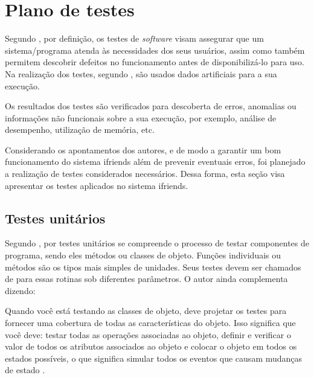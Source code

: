 \section{Plano de testes}
Segundo , por definição, os testes de \textit{software} visam assegurar que um sistema/programa atenda às necessidades dos seus usuários, assim como também permitem descobrir defeitos no funcionamento antes de disponibilizá-lo para uso. Na realização dos testes, segundo , são usados dados artificiais para a sua execução.

\begin{citacao}
Os resultados dos testes são verificados para descoberta de erros, anomalias ou informações não funcionais sobre a sua execução, por exemplo, análise de desempenho, utilização de memória, etc. \cite{Polo:2020}
\end{citacao}

Considerando os apontamentos dos autores, e de modo a garantir um bom funcionamento do sistema \gls{ifriends} além de prevenir eventuais erros, foi planejado a realização de testes considerados necessários. Dessa forma, esta seção visa apresentar os testes aplicados no sistema \gls{ifriends}.

\subsection{Testes unitários}
Segundo , por testes unitários se compreende o processo de testar componentes de programa, sendo eles métodos ou classes de objeto. Funções individuais ou métodos são os tipos mais simples de unidades. Seus testes devem ser chamados de para essas rotinas sob diferentes parâmetros. O autor ainda complementa dizendo: 

\begin{citacao}
Quando você está testando as classes de objeto, deve projetar os testes para fornecer uma cobertura de todas as características do objeto. Isso significa que você deve: testar todas as operações associadas ao objeto, definir e verificar o valor de todos os atributos associados ao objeto e colocar o objeto em todos os estados possíveis, o que significa simular todos os eventos que causam mudanças de estado
\cite{SOMMERVILLE:2011}.
\end{citacao}

